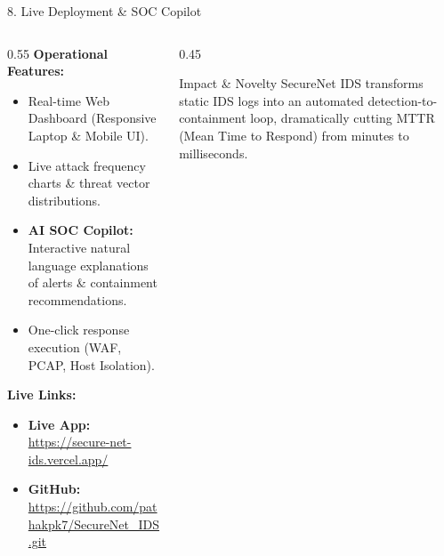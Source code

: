 ﻿\documentclass[aspectratio=169, 10pt]{beamer}
\begin{document}
\begin{frame}{8. Live Deployment \& SOC Copilot}
    \begin{columns}
        \begin{column}{0.55\textwidth}
            \textbf{Operational Features:}
            \begin{itemize}
                \item Real-time Web Dashboard (Responsive Laptop \& Mobile UI).
                \item Live attack frequency charts \& threat vector distributions.
                \item \textbf{AI SOC Copilot:} Interactive natural language explanations of alerts \& containment recommendations.
                \item One-click response execution (WAF, PCAP, Host Isolation).
            \end{itemize}
            
            \vspace{0.2cm}
            \textbf{Live Links:}
            \begin{itemize}
                \item \textbf{Live App:} \url{https://secure-net-ids.vercel.app/}
                \item \textbf{GitHub:} \url{https://github.com/pathakpk7/SecureNet_IDS.git}
            \end{itemize}
        \end{column}
        \begin{column}{0.45\textwidth}
            \begin{exampleblock}{Impact \& Novelty}
                SecureNet IDS transforms static IDS logs into an automated detection-to-containment loop, dramatically cutting MTTR (Mean Time to Respond) from minutes to milliseconds.
            \end{exampleblock}
        \end{column}
    \end{columns}
\end{frame}
\end{document}
